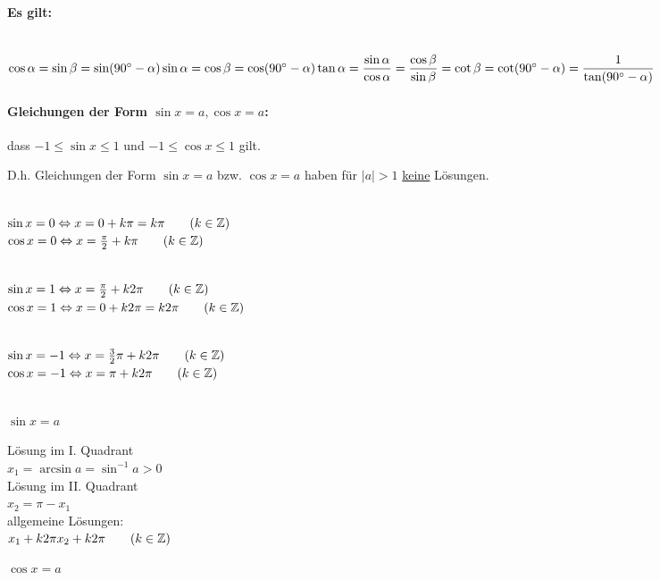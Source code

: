 
\paragraph{Es gilt:} \quad\\
$\cos\alpha=\sin\beta = \sin(90{^\circ} - \alpha)\\
\sin\alpha=\cos\beta = \cos(90{^\circ} - \alpha)\\
\tan\alpha=\dfrac{\sin\alpha}{\cos\alpha} = \dfrac{\cos\beta}{\sin\beta} =\cot\beta = \cot(90{^\circ} - \alpha) = \dfrac{1}{\tan(90{^\circ} - \alpha)}$

\paragraph{Gleichungen der Form $\sin x = a, \cos x = a$:}
\Beachte dass $-1\le\sin x\le 1$ und $-1\le\cos x\le 1$ gilt.

D.h. Gleichungen der Form $\sin x = a$ bzw. $\cos x = a$ haben für $|a|>1$ \ul{keine} Lösungen.

\\
$\sin x = 0 \Leftrightarrow x =0+k\pi = k\pi \qquad (k\in\mathbb{Z})$\\
$\cos x = 0 \Leftrightarrow x =\frac{\pi}{2}+k\pi \qquad (k\in\mathbb{Z})$

\\
$\sin x = 1 \Leftrightarrow x =\frac{\pi}{2}+k2\pi \qquad (k\in\mathbb{Z})$\\
$\cos x = 1 \Leftrightarrow x =0+k2\pi = k2\pi \qquad (k\in\mathbb{Z})$

\\
$\sin x = -1 \Leftrightarrow x =\frac{3}{2}\pi+k2\pi \qquad (k\in\mathbb{Z})$\\
$\cos x = -1 \Leftrightarrow x =\pi+k2\pi \qquad (k\in\mathbb{Z})$

\\
$\sin x = a$

Lösung im I. Quadrant\\
$x_1 = \arcsin a = \sin^{-1}a>0$\\
Lösung im II. Quadrant\\
$x_2 = \pi - x_1$\\
allgemeine Lösungen:\\
$x_1+k2\pi\\
x_2+k2\pi \qquad (k\in\mathbb{Z})$

$\cos x = a$

